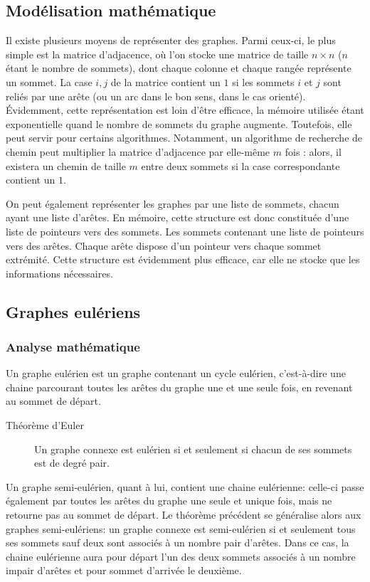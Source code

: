 \subsection{Modélisation mathématique}
Il existe plusieurs moyens de représenter des graphes. Parmi ceux-ci,
le plus simple est la matrice d'adjacence, où l'on stocke une matrice
de taille $n\times n$ ($n$ étant le nombre de sommets), dont chaque
colonne et chaque rangée représente un sommet. La case $i, j$ de la
matrice contient un $1$ si les sommets $i$ et $j$ sont reliés par une
arête (ou un arc dans le bon sens, dans le cas orienté). Évidemment,
cette représentation est loin d'être efficace, la mémoire utilisée
étant exponentielle quand le nombre de sommets du graphe
augmente. Toutefois, elle peut servir pour certains
algorithmes. Notamment, un algorithme de recherche de chemin peut
multiplier la matrice d'adjacence par elle-même $m$ fois : alors, il
existera un chemin de taille $m$ entre deux sommets si la case
correspondante contient un $1$.

  On peut également représenter les graphes par une liste de sommets,
  chacun ayant une liste d'arêtes.
  En mémoire, cette structure est donc constituée d'une liste de pointeurs
  vers des sommets. Les sommets contenant une liste de pointeurs vers des
  arêtes. Chaque arête dispose d'un pointeur vers chaque sommet extrémité.
  Cette structure est évidemment plus efficace, car elle ne stocke que
  les informations nécessaires.


\subsection{Graphes eulériens}
  \subsubsection{Analyse mathématique}
    Un graphe eulérien est un graphe contenant un cycle eulérien, c'est-à-dire
    une chaine parcourant toutes les arêtes du graphe une et une seule fois, en
    revenant au sommet de départ.

    \begin{description}
      \item[Théorème d'Euler] Un graphe connexe est eulérien si et seulement si
        chacun de ses sommets est de degré pair.
    \end{description}

    Un graphe semi-eulérien, quant à lui, contient une chaine eulérienne:
    celle-ci passe également par toutes les arêtes du graphe une seule et
    unique fois, mais ne retourne pas au sommet de départ. Le théorème précédent
    se généralise alors aux graphes semi-eulériens: un graphe connexe est
    semi-eulérien si et seulement tous ses sommets sauf deux sont associés à un
    nombre pair d'arêtes. Dans ce cas, la chaine eulérienne aura pour départ
    l'un des deux sommets associés à un nombre impair d'arêtes et pour sommet
    d'arrivée le deuxième.

